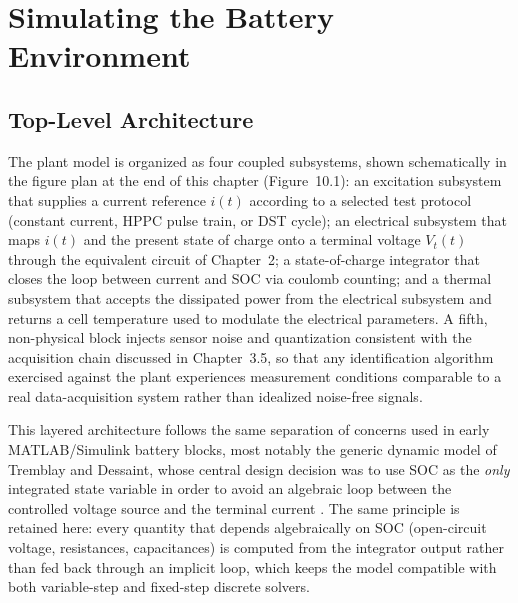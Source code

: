 \section{Simulating the Battery Environment}
\label{sec:10_1}

\subsection{Top-Level Architecture}

The plant model is organized as four coupled subsystems, shown
schematically in the figure plan at the end of this chapter
(Figure~10.1): an excitation subsystem that supplies a current
reference $i(t)$ according to a selected test protocol (constant
current, HPPC pulse train, or DST cycle); an electrical subsystem that
maps $i(t)$ and the present state of charge onto a terminal voltage
$V_t(t)$ through the equivalent circuit of Chapter~2; a
state-of-charge integrator that closes the loop between current and
SOC via coulomb counting; and a thermal subsystem that accepts the
dissipated power from the electrical subsystem and returns a cell
temperature used to modulate the electrical parameters. A fifth,
non-physical block injects sensor noise and quantization consistent
with the acquisition chain discussed in Chapter~3.5, so that any
identification algorithm exercised against the plant experiences
measurement conditions comparable to a real data-acquisition system
rather than idealized noise-free signals.

This layered architecture follows the same separation of concerns
used in early MATLAB/Simulink battery blocks, most notably the
generic dynamic model of Tremblay and Dessaint, whose central design
decision was to use SOC as the \emph{only} integrated state variable
in order to avoid an algebraic loop between the controlled voltage
source and the terminal current \cite{tremblay2007,tremblay2009}. The
same principle is retained here: every quantity that depends
algebraically on SOC (open-circuit voltage, resistances,
capacitances) is computed from the integrator output rather than fed
back through an implicit loop, which keeps the model compatible with
both variable-step and fixed-step discrete solvers.

